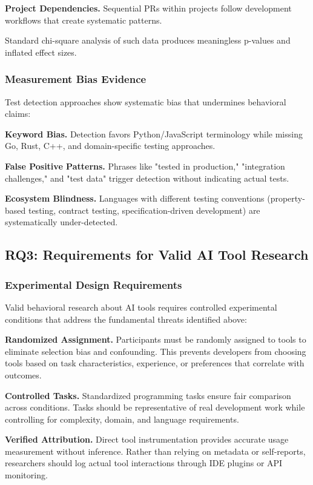 \documentclass[conference]{IEEEtran}
\begin{document}
\textbf{Project Dependencies.} Sequential PRs within projects follow development workflows that create systematic patterns.

Standard chi-square analysis of such data produces meaningless p-values and inflated effect sizes.

\subsubsection{Measurement Bias Evidence}

Test detection approaches show systematic bias that undermines behavioral claims:

\textbf{Keyword Bias.} Detection favors Python/JavaScript terminology while missing Go, Rust, C++, and domain-specific testing approaches.

\textbf{False Positive Patterns.} Phrases like "tested in production," "integration challenges," and "test data" trigger detection without indicating actual tests.

\textbf{Ecosystem Blindness.} Languages with different testing conventions (property-based testing, contract testing, specification-driven development) are systematically under-detected.

\subsection{RQ3: Requirements for Valid AI Tool Research}

\subsubsection{Experimental Design Requirements}

Valid behavioral research about AI tools requires controlled experimental conditions that address the fundamental threats identified above:

\textbf{Randomized Assignment.} Participants must be randomly assigned to tools to eliminate selection bias and confounding. This prevents developers from choosing tools based on task characteristics, experience, or preferences that correlate with outcomes.

\textbf{Controlled Tasks.} Standardized programming tasks ensure fair comparison across conditions. Tasks should be representative of real development work while controlling for complexity, domain, and language requirements.

\textbf{Verified Attribution.} Direct tool instrumentation provides accurate usage measurement without inference. Rather than relying on metadata or self-reports, researchers should log actual tool interactions through IDE plugins or API monitoring.
\end{document}
